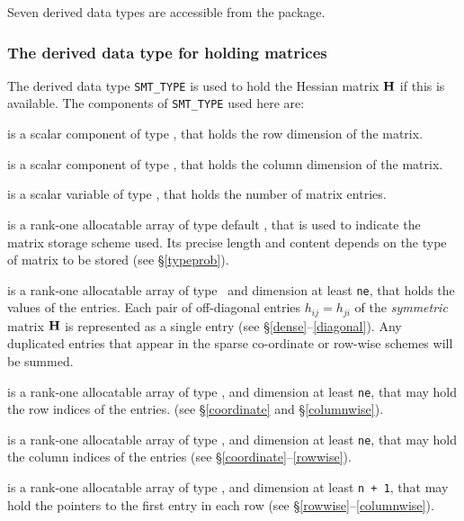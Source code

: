 \documentclass{galahad}
\begin{document}




\galtypes
Seven derived data types are accessible from the package.


\subsubsection{The derived data type for holding matrices}\label{typesmt}
The derived data type {\tt SMT\_TYPE} is used to hold the Hessian matrix ${\mathbf{H}}$
if this is available. The components of {\tt SMT\_TYPE} used here are:

\begin{description}

 is a scalar component of type \integer,
that holds the row dimension of the matrix.

 is a scalar component of type \integer,
that holds the column dimension of the matrix.

 is a scalar variable of type \integer, that
holds the number of matrix entries.

 is a rank-one allocatable array of type default \character, that
is used to indicate the matrix storage scheme used. Its precise length and
content depends on the type of matrix to be stored (see \S\ref{typeprob}).

 is a rank-one allocatable array of type \realdp\,
and dimension at least {\tt ne}, that holds the values of the entries.
Each pair of off-diagonal entries $h_{ij} = h_{ji}$ of the {\em symmetric}
matrix ${\mathbf{H}}$ is represented as a single entry
(see \S\ref{dense}--\ref{diagonal}).
Any duplicated entries that appear in the sparse
co-ordinate or row-wise schemes will be summed.

 is a rank-one allocatable array of type \integer,
and dimension at least {\tt ne}, that may hold the row indices of the entries.
(see \S\ref{coordinate} and \S\ref{columnwise}).

 is a rank-one allocatable array of type \integer,
and dimension at least {\tt ne}, that may hold the column indices of the entries
(see \S\ref{coordinate}--\ref{rowwise}).

 is a rank-one allocatable array of type \integer,
and dimension at least {\tt n + 1}, that may hold the pointers to
the first entry in each row (see \S\ref{rowwise}--\ref{columnwise}).

\end{description}
\end{document}
